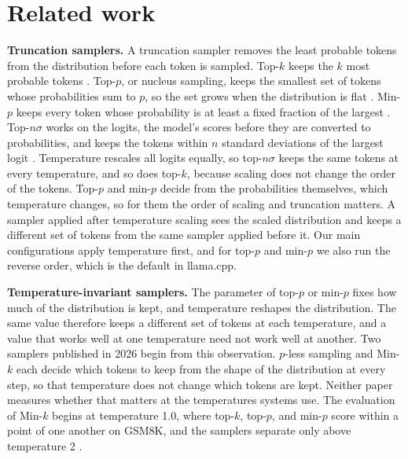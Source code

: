 \documentclass[10pt]{article}
\begin{document}
\section{Related work}
\label{sec:background}

\textbf{Truncation samplers.} A truncation sampler removes the least probable tokens from the
distribution before each token is sampled. Top-$k$ keeps the $k$ most probable tokens
\citep{fan2018hierarchical}. Top-$p$, or nucleus sampling, keeps the smallest set of tokens
whose probabilities sum to $p$, so the set grows when the distribution is flat
\citep{holtzman2020curious}. Min-$p$ keeps every token whose probability is at least a fixed
fraction of the largest \citep{nguyen2024minp}. Top-$n\sigma$ works on the logits, the model's
scores before they are converted to probabilities, and keeps the tokens within $n$ standard
deviations of the largest logit \citep{tang2024topn}. Temperature rescales all logits equally,
so top-$n\sigma$ keeps the same tokens at every temperature, and so does top-$k$, because
scaling does not change the order of the tokens. Top-$p$ and min-$p$ decide from the
probabilities themselves, which temperature changes, so for them the order of scaling and
truncation matters. A sampler applied after temperature scaling sees the scaled distribution
and keeps a different set of tokens from the same sampler applied before it. Our main
configurations apply temperature first, and for top-$p$ and min-$p$ we also run the reverse
order, which is the default in llama.cpp.

\textbf{Temperature-invariant samplers.} The parameter of top-$p$ or min-$p$ fixes how much of
the distribution is kept, and temperature reshapes the distribution. The same value therefore
keeps a different set of tokens at each temperature, and a value that works well at one
temperature need not work well at another. Two samplers published in 2026 begin from this
observation. $p$-less sampling \citep{tan2026pless} and Min-$k$ \citep{ding2026mink} each
decide which tokens to keep from the shape of the distribution at every step, so that
temperature does not change which tokens are kept. Neither paper measures whether that matters
at the temperatures systems use. The evaluation of Min-$k$ begins at temperature 1.0, where
top-$k$, top-$p$, and min-$p$ score within a point of one another on GSM8K, and the samplers
separate only above temperature 2 \citep{ding2026mink}.
\end{document}
